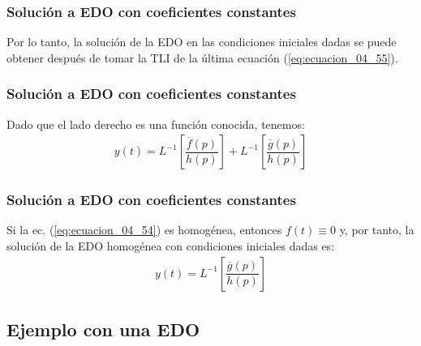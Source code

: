 \begin{frame}
\frametitle{Solución a EDO con coeficientes constantes}
Por lo tanto, la solución de la EDO en las condiciones iniciales dadas se puede obtener después de tomar la TLI de la última ecuación (\ref{eq:ecuacion_04_55}).
\end{frame}
\begin{frame}
\frametitle{Solución a EDO con coeficientes constantes}
Dado que el lado derecho es una función conocida, tenemos:
\pause
\begin{align}
y(t) = L^{-1} \left[ \dfrac{\overline{f}(p)}{h(p)} \right] + L^{-1} \left[ \dfrac{\overline{g}(p)}{h(p)} \right]
\label{eq:ecuacion_04_56}
\end{align}
\end{frame}
\begin{frame}
\frametitle{Solución a EDO con coeficientes constantes}
Si la ec. (\ref{eq:ecuacion_04_54}) es homogénea, \pause entonces $f (t) \equiv 0$ y, por tanto, la solución de la EDO homogénea con condiciones iniciales dadas es:
\pause
\begin{align}
y(t) = L^{-1} \left[ \dfrac{\overline{g}(p)}{h(p)} \right]
\label{eq:ecuacion_04_57}
\end{align}
\end{frame}

\subsection*{Ejemplo con una EDO}

